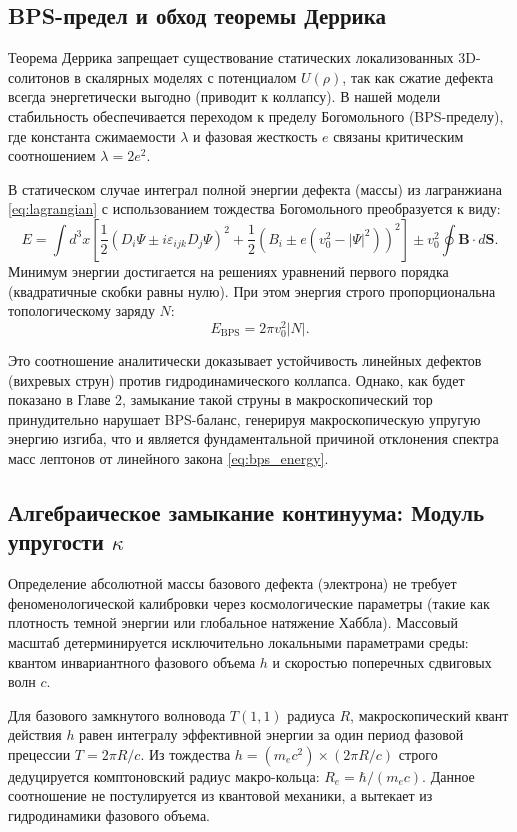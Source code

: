 \documentclass[11pt,a4paper]{article}
\begin{document}
\subsection{BPS-предел и обход теоремы Деррика}
Теорема Деррика запрещает существование статических локализованных 3D-солитонов в скалярных моделях с потенциалом $U(\rho)$, так как сжатие дефекта всегда энергетически выгодно (приводит к коллапсу). 
В нашей модели стабильность обеспечивается переходом к пределу Богомольного (BPS-пределу), где константа сжимаемости $\lambda$ и фазовая жесткость $e$ связаны критическим соотношением $\lambda = 2e^2$.
	
В статическом случае интеграл полной энергии дефекта (массы) из лагранжиана \eqref{eq:lagrangian} с использованием тождества Богомольного преобразуется к виду:
\begin{equation}
E = \int d^3x \left[ \frac{1}{2} \left( D_i \Psi \pm i \varepsilon_{ijk} D_j \Psi \right)^2 + \frac{1}{2} \left( B_i \pm e(v_0^2 - |\Psi|^2) \right)^2 \right] \pm v_0^2 \oint \mathbf{B} \cdot d\mathbf{S}.
\end{equation}
Минимум энергии достигается на решениях уравнений первого порядка (квадратичные скобки равны нулю). При этом энергия строго пропорциональна топологическому заряду $N$:
\begin{equation}
E_{\text{BPS}} = 2\pi v_0^2 |N|.
\label{eq:bps_energy}
\end{equation}
	
Это соотношение аналитически доказывает устойчивость линейных дефектов (вихревых струн) против гидродинамического коллапса. Однако, как будет показано в Главе 2, замыкание такой струны в макроскопический тор принудительно нарушает BPS-баланс, генерируя макроскопическую упругую энергию изгиба, что и является фундаментальной причиной отклонения спектра масс лептонов от линейного закона \eqref{eq:bps_energy}.

\subsection{Алгебраическое замыкание континуума: Модуль упругости $\kappa$}
Определение абсолютной массы базового дефекта (электрона) не требует феноменологической калибровки через космологические параметры (такие как плотность темной энергии или глобальное натяжение Хаббла). Массовый масштаб детерминируется исключительно локальными параметрами среды: квантом инвариантного фазового объема $h$ и скоростью поперечных сдвиговых волн $c$.

Для базового замкнутого волновода $T(1,1)$ радиуса $R$, макроскопический квант действия $h$ равен интегралу эффективной энергии за один период фазовой прецессии $T = 2\pi R/c$. Из тождества $h = (m_e c^2) \times (2\pi R/c)$ строго дедуцируется комптоновский радиус макро-кольца: $R_e = \hbar / (m_e c)$. Данное соотношение не постулируется из квантовой механики, а вытекает из гидродинамики фазового объема.
\end{document}
